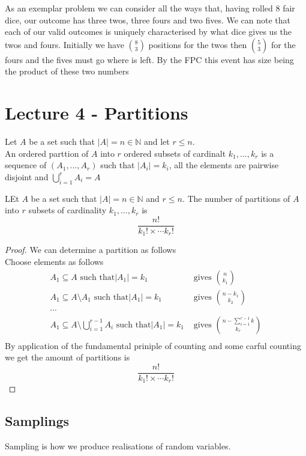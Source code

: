 \documentclass{article}
\begin{document}
As an exemplar problem we can consider all the ways that, having rolled 8 fair dice, our outcome has three twos, three fours and two fives. We can note that each of our valid outcomes is uniquely characterised by what dice gives us the twos and fours. Initially we have $8\choose{3}$ positions for the twos then $5\choose{3}$ for the fours and the fives must go where is left. By the FPC this event has size being the product of these two numbers 
\section{Lecture 4 - Partitions}
\begin{definition}
    Let $A$ be a set such that $|A| = n\in \mathbb{N}$ and let $r \le n$. \\
    An ordered parttion of $A$ into $r$ ordered subsets of cardinalt $k_1,\dots , k_r$ is a sequence of $(A_1,\dots,A_r)$ such that $|A_i| = k_i$, all the elements are pairwise disjoint and $\bigcup_{i=1}^rA_i = A$
\end{definition}
\begin{proposition}
    LEt $A$ be a set such that $|A| = n \in \mathbb{N}$ and $r \le n$. The number of partitions of $A$ into $r$ subsets of cardinality $k_1,\dots,k_r$ is \[\frac{n!}{k_1!\times\cdots k_r!}\]
\end{proposition}
\begin{proof}
    We can determine a partition as follows \\
    Choose elements as follows
    \begin{align*}
        A_1 \subseteq A \text{ such that} |A_1| = k_1 &\text{ gives } {n\choose{k_1}} \\
        A_1 \subseteq A \text{\textbackslash} A_1 \text{ such that} |A_1| = k_1 &\text{ gives } {{n - k_1}\choose{k_2}} \\
        \cdots &\\
        A_1 \subseteq A \text{\textbackslash} \bigcup_{i = 1}^{r-1}A_i \text{ such that} |A_1| = k_1 &\text{ gives } {{n - \sum_{i = 1}^{r-1}k}\choose{k_r}} \\
    \end{align*}
    By application of the fundamental priniple of counting and some carful counting we get the amount of partitions is \[\frac{n!}{k_1!\times\cdots k_r!}\]
\end{proof}
\subsection{Samplings}
Sampling is how we produce realisations of random variables.
\end{document}

